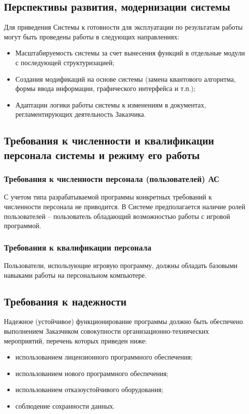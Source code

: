 \subsection{Перспективы развития, модернизации системы}
Для приведения Системы к готовности для эксплуатации по результатам работы
могут быть проведены работы в следующих направлениях:
\begin{itemize}
  \item Масштабируемость системы за счет вынесения функций в отдельные модули
    с последующей структуризацией;
  \item Создания модификаций на основе системы (замена квантового алгоритма,
    формы ввода информации, графического интерфейса и т.п.);
  \item Адаптации логики работы системы к изменениям в документах,
    регламентирующих деятельность Заказчика.
\end{itemize}

\subsection{Требования к численности и квалификации персонала системы и режиму его работы}
\subsubsection{Требования к численности персонала (пользователей) АС}
С учетом типа разрабатываемой программы конкретных требований к численности
персонала не приводится. В Системе предполагается наличие ролей
пользователей -- пользователь обладающий возможностью работы с игровой
программой.

\subsubsection{Требования к квалификации персонала}
Пользователи, использующие игровую программу, должны обладать базовыми
навыками работы на персональном компьютере.

\subsection{Требования к надежности}
Надежное (устойчивое) функционирование программы должно быть обеспечено
выполнением Заказчиком совокупности организационно-технических мероприятий,
перечень которых приведен ниже: 
\begin{itemize}
  \item использованием лицензионного программного обеспечения; 
  \item использованием нового программного обеспечения;
  \item использованием отказоустойчивого оборудования;
  \item соблюдение сохранности данных.
\end{itemize}

